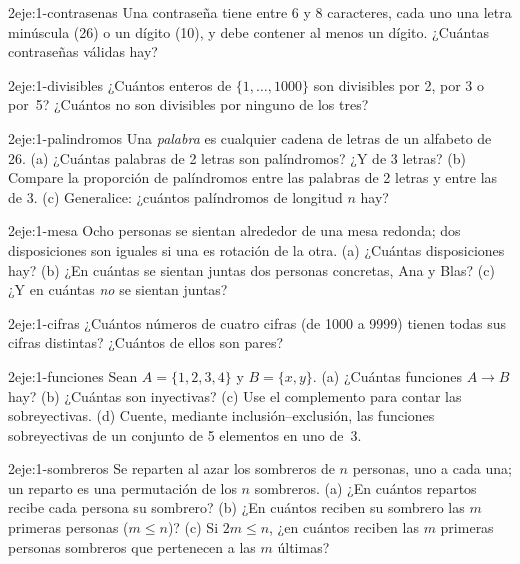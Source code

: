 \begin{ejercicio}{2}{eje:1-contrasenas}
Una contraseña tiene entre 6 y 8 caracteres, cada uno una letra minúscula (26) o un dígito (10), y debe contener al menos un dígito. ¿Cuántas contraseñas válidas hay?
\end{ejercicio}

\begin{ejercicio}{2}{eje:1-divisibles}
¿Cuántos enteros de $\{1,\dots,1000\}$ son divisibles por 2, por 3 o por~5? ¿Cuántos no son divisibles por ninguno de los tres?
\end{ejercicio}

\begin{ejercicio}{2}{eje:1-palindromos}
Una \emph{palabra} es cualquier cadena de letras de un alfabeto de 26. (a) ¿Cuántas palabras de 2 letras son palíndromos? ¿Y de 3 letras? (b) Compare la proporción de palíndromos entre las palabras de 2 letras y entre las de 3. (c) Generalice: ¿cuántos palíndromos de longitud $n$ hay?
\end{ejercicio}

\begin{ejercicio}{2}{eje:1-mesa}
Ocho personas se sientan alrededor de una mesa redonda; dos disposiciones son iguales si una es rotación de la otra. (a) ¿Cuántas disposiciones hay? (b) ¿En cuántas se sientan juntas dos personas concretas, Ana y Blas? (c) ¿Y en cuántas \emph{no} se sientan juntas?
\end{ejercicio}

\begin{ejercicio}{2}{eje:1-cifras}
¿Cuántos números de cuatro cifras (de 1000 a 9999) tienen todas sus cifras distintas? ¿Cuántos de ellos son pares?
\end{ejercicio}

\begin{ejercicio}{2}{eje:1-funciones}
Sean $A=\{1,2,3,4\}$ y $B=\{x,y\}$. (a) ¿Cuántas funciones $A\to B$ hay? (b) ¿Cuántas son inyectivas? (c) Use el complemento para contar las sobreyectivas. (d) Cuente, mediante inclusión--exclusión, las funciones sobreyectivas de un conjunto de 5 elementos en uno de~3.
\end{ejercicio}

\begin{ejercicio}{2}{eje:1-sombreros}
Se reparten al azar los sombreros de $n$ personas, uno a cada una; un reparto es una permutación de los $n$ sombreros. (a) ¿En cuántos repartos recibe cada persona su sombrero? (b) ¿En cuántos reciben su sombrero las $m$ primeras personas ($m\le n$)? (c) Si $2m\le n$, ¿en cuántos reciben las $m$ primeras personas sombreros que pertenecen a las $m$ últimas?
\end{ejercicio}


